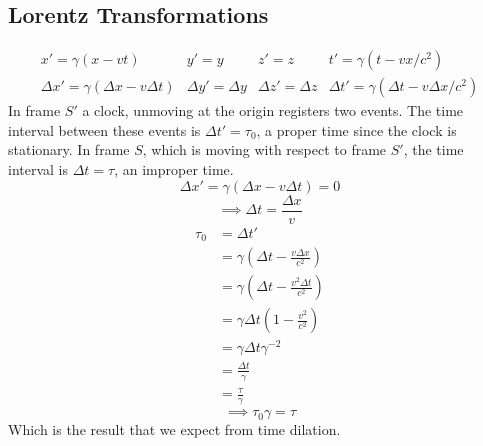 \documentclass{article}
\begin{document}
    \subsection{Lorentz Transformations}
    \[
        \begin{array}{cccc}
            x' = \gamma(x - vt) & y' = y & z' = z & t' = \gamma(t - vx/c^2)\\[0.25cm]
            \Delta x' = \gamma(\Delta x - v\Delta t) & \Delta y' = \Delta y & \Delta z' = \Delta z & \Delta t' = \gamma(\Delta t - v\Delta x/c^2)
        \end{array}
    \]
    In frame \(S'\) a clock, unmoving at the origin registers two events.
    The time interval between these events is \(\Delta t' = \tau_0\), a proper time since the clock is stationary.
    In frame \(S\), which is moving with respect to frame \(S'\), the time interval is \(\Delta t = \tau\), an improper time.
    \[\Delta x' = \gamma(\Delta x-v\Delta t) = 0\]
    \[\implies \Delta t = \frac{\Delta x}{v}\]
    \begin{align*}
        \tau_0 &= \Delta t'\\
        &= \gamma\left(\Delta t - \frac{v\Delta x}{c^2}\right)\\
        &= \gamma\left(\Delta t - \frac{v^2\Delta t}{c^2}\right)\\
        &= \gamma\Delta t\left(1 - \frac{v^2}{c^2}\right)\\
        &= \gamma\Delta t\gamma^{-2}\\
        &= \frac{\Delta t}{\gamma}\\
        &= \frac{\tau}{\gamma}        
    \end{align*}
    \[\implies \tau_0 \gamma = \tau\]
    Which is the result that we expect from time dilation.
    
\end{document}
